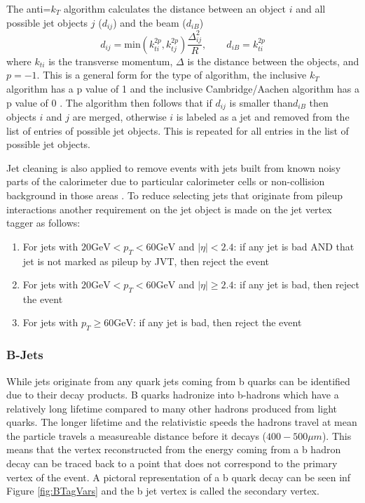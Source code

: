 The anti=$k_T$ algorithm calculates the distance between an object $i$ and all possible jet objects $j$ ($d_{ij}$) and the beam ($d_{iB}$)
\[ d_{ij} = \text{min}(k_{ti}^{2p},k_{tj}^{2p})\frac{\Delta^2_{ij}}{R},\qquad 
d_{iB} = k_{ti}^{2p} \] 
where $k_{ti}$ is the transverse momentum, $\Delta$ is the distance between the objects, and $p=-1$.  This is a general form for the type of algorithm, the inclusive $k_T$ algorithm has a p value of 1 and the inclusive Cambridge/Aachen algorithm has a p value of 0 \cite{CambridgeAachen}.  The algorithm then follows that if $d_{ij}$ is smaller than$d_{iB}$ then objects $i$ and $j$ are merged, otherwise $i$ is labeled as a jet and removed from the list of entries of possible jet objects.  This is repeated for all entries in the list of possible jet objects.

Jet cleaning is also applied to remove events with jets built from known noisy parts of the calorimeter due to particular calorimeter cells or non-collision background in those areas \cite{JetCleaning}.  To reduce selecting jets that originate from pileup interactions another requirement on the jet object is made on the jet vertex tagger \cite{JetJVT, JetCleanTwiki} as follows:
\begin{enumerate}
\item For jets with $20 \mathrm{ GeV } < p_{T} < 60 \mathrm{ GeV }$ and $|\eta| < 2.4$: if any jet is bad AND that jet is not marked as pileup by JVT, then reject the event
\item For jets with $20 \mathrm{ GeV } < p_{T} < 60 \mathrm{ GeV }$ and $|\eta| \geq 2.4$: if any jet is bad, then reject the event
\item For jets with $p_{T} \geq 60 \mathrm{ GeV }$: if any jet is bad, then reject the event
\end{enumerate}


\subsubsection{B-Jets}

While jets originate from any quark jets coming from b quarks can be identified due to their decay products.  B quarks hadronize into b-hadrons which have a relatively long lifetime compared to many other hadrons produced from light quarks.  The longer lifetime and the relativistic speeds the hadrons travel at mean the particle travels a measureable distance before it decays ($400-500 \mu m$)\cite{CMSct}.  This means that the vertex reconstructed from the energy coming from a b hadron decay can be traced back to a point that does not correspond to the primary vertex of the event.    A pictoral representation of a b quark decay can be seen inf Figure \ref{fig:BTagVars} and the b jet vertex is called the secondary vertex.  

